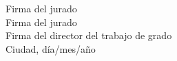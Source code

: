 \vspace{4cm}
Firma del jurado\\
Firma del jurado\\
Firma del director del trabajo de grado\\[2cm]
Ciudad, d\'ia/mes/a\~no